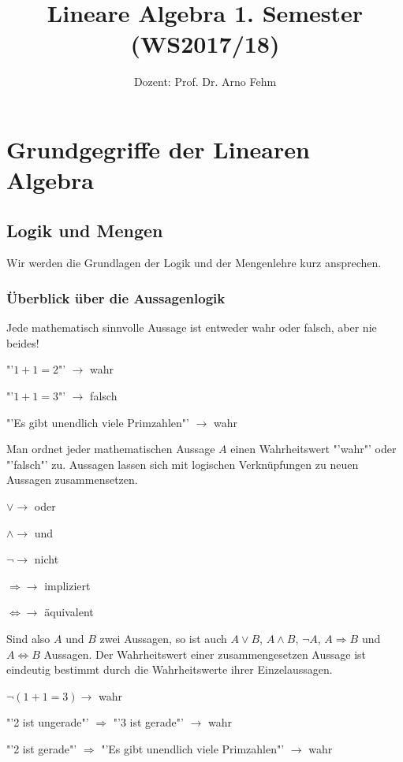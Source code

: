 \documentclass[11pt]{article}
\title{\textbf{Lineare Algebra 1. Semester (WS2017/18)}}
\author{Dozent: Prof. Dr. Arno Fehm}
\date{}
\begin{document}
\maketitle

\raggedright 
\section{Grundgegriffe der Linearen Algebra}
	\subsection{Logik und Mengen}
		Wir werden die Grundlagen der Logik und der Mengenlehre kurz ansprechen.
		\subsubsection{\"Uberblick \"uber die Aussagenlogik}
			Jede mathematisch sinnvolle Aussage ist entweder wahr oder falsch, aber nie beides!
			\begin{compactitem}
				\item "'$1+1=2$"' $\to$ wahr
				\item "'$1+1=3$"' $\to$ falsch
				\item "'Es gibt unendlich viele Primzahlen"' $\to$ wahr
			\end{compactitem}
			Man ordnet jeder mathematischen Aussage $A$ einen Wahrheitswert "'wahr"' oder "'falsch"' zu. Aussagen
			lassen sich mit logischen Verkn\"upfungen zu neuen Aussagen zusammensetzen.
			\begin{compactitem}
				\item $\lor \to$ oder
				\item $\land \to$ und
				\item $\lnot \to$ nicht
				\item $\Rightarrow \to$ impliziert
				\item $\iff \to$ \"aquivalent
			\end{compactitem}
			Sind also $A$ und $B$ zwei Aussagen, so ist auch $A \lor B$, $A \land B$, $\lnot A$, 
			$A \Rightarrow B$ und $A \iff B$ Aussagen. Der Wahrheitswert einer zusammengesetzen Aussage ist
			eindeutig bestimmt durch die Wahrheitswerte ihrer Einzelaussagen.
			\begin{compactitem}
				\item $\lnot (1+1=3) \to$ wahr
				\item "'2 ist ungerade"' $\Rightarrow$ "'3 ist gerade"' $\to$ wahr
				\item "'2 ist gerade"' $\Rightarrow$ "'Es gibt unendlich viele Primzahlen"' $\to$ wahr
			\end{compactitem}
\end{document}
